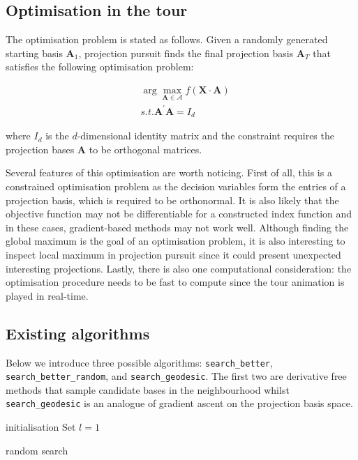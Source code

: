 \documentclass[12pt]{article}
\begin{document}
\hypertarget{tour-optim}{%
\subsection{Optimisation in the tour}\label{tour-optim}}

The optimisation problem is stated as follows. Given a randomly generated starting basis \(\mathbf{A}_1\), projection pursuit finds the final projection basis \(\mathbf{A}_T\) that satisfies the following optimisation problem:

\begin{align}
&\arg \max_{\mathbf{A} \in \mathcal{A}} f(\mathbf{X} \cdot \mathbf{A}) \\
&s.t.  \mathbf{A}^{\prime} \mathbf{A} = I_d
\end{align}

where \(I_d\) is the \(d\)-dimensional identity matrix and the constraint requires the projection bases \(\mathbf{A}\) to be orthogonal matrices.

Several features of this optimisation are worth noticing. First of all, this is a constrained optimisation problem as the decision variables form the entries of a projection basis, which is required to be orthonormal. It is also likely that the objective function may not be differentiable for a constructed index function and in these cases, gradient-based methods may not work well. Although finding the global maximum is the goal of an optimisation problem, it is also interesting to inspect local maximum in projection pursuit since it could present unexpected interesting projections. Lastly, there is also one computational consideration: the optimisation procedure needs to be fast to compute since the tour animation is played in real-time.

\hypertarget{existing-algorithms}{%
\subsection{Existing algorithms}\label{existing-algorithms}}

Below we introduce three possible algorithms: \texttt{search\_better}, \texttt{search\_better\_random}, and \texttt{search\_geodesic}. The first two are derivative free methods that sample candidate bases in the neighbourhood whilst \texttt{search\_geodesic} is an analogue of gradient ascent on the projection basis space.

\begin{algorithm}
\SetAlgoLined
  initialisation\;
  Set $l = 1$\;
  \caption{random search}
  \label{random-search}
\end{algorithm}
\end{document}
